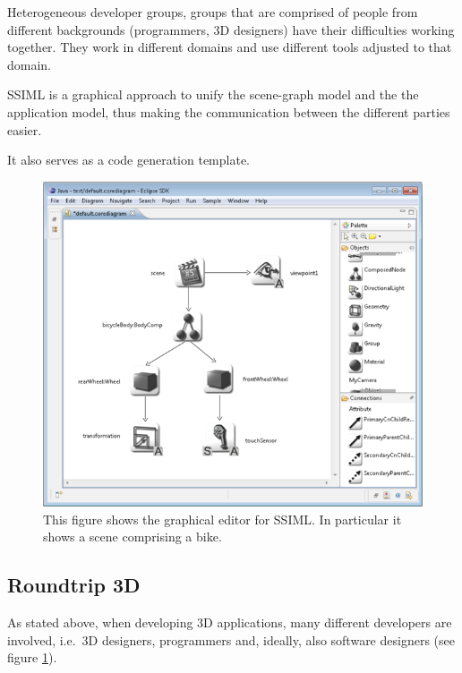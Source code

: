 Heterogeneous developer groups, groups that are comprised of people from
different backgrounds (programmers, 3D designers) have their difficulties
working together. They work in different domains and use different tools
adjusted to that domain. \cite{Glinz:2015:SUS:2802768.2802838}

SSIML is a graphical approach to unify the scene-graph model and the the
application model, thus making the communication between the different
parties easier.

It also serves as a code generation template.

\begin{figure}[htbp]
  \centering
  \includegraphics[width=12cm]{../assets/SSIML.png}
	\caption{This figure shows the graphical editor for SSIML. In particular it shows a scene comprising a bike. \cite{roundtrip3dwebsite}}
	\label{fig:ssimldiagram}
\end{figure}

\subsection{Roundtrip 3D}\label{roundtrip-3d}

As stated above, when developing 3D applications, many different
developers are involved, i.e.~3D designers, programmers and, ideally,
also software designers (see figure \ref{fig:ssimldiagram}).


